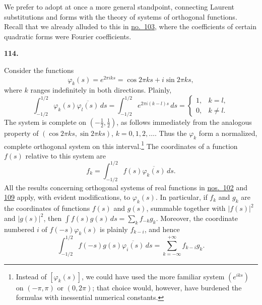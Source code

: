 \documentclass[
  paper=b5,
  fontsize=13pt,
  twoside=true,
  open=any,
  bookmarkpackage=false,
  chapterprefix=true,
  headings=normal
]{scrbook}
\theoremstyle{definition}
\newcommand{\numberedparagraph}[1]{%
  \par\medskip\phantomsection\label{sec:#1}%
  \noindent\textbf{#1.}\enspace
}
\begin{document}
We prefer to adopt at once a more general standpoint, connecting Laurent
substitutions and forms with the theory of systems of orthogonal functions.
Recall that we already alluded to this in \hyperref[sec:103]{no.~103}, where
the coefficients of certain quadratic forms were Fourier coefficients.

\numberedparagraph{114}
Consider the functions
\[
  \varphi_k(s)=e^{2\pi iks}=\cos2\pi ks+i\sin2\pi ks,
\]
where \(k\) ranges indefinitely in both directions.  Plainly,
\[
  \int_{-1/2}^{1/2}\varphi_k(s)\overline{\varphi_l(s)}\,ds
  =\int_{-1/2}^{1/2}e^{2\pi i(k-l)s}\,ds
  =\begin{cases}1,&k=l,\\0,&k\ne l.\end{cases}
\]
The system is complete on \((-\tfrac12,\tfrac12)\), as follows immediately
from the analogous property of
\((\cos2\pi ks,\sin2\pi ks)\), \(k=0,1,2,\ldots\).  Thus the
\(\varphi_k\) form a normalized, complete orthogonal system on this
interval.\footnote{Instead of \([\varphi_k(s)]\), we could have used the more
familiar system \((e^{iks})\) on \((-\pi,\pi)\) or \((0,2\pi)\); that choice
would, however, have burdened the formulas with inessential numerical
constants.}
The coordinates of a function \(f(s)\) relative to this system are
\[
  f_k=\int_{-1/2}^{1/2}f(s)\overline{\varphi_k(s)}\,ds.
\]
All the results concerning orthogonal systems of real functions in
\hyperref[sec:102]{nos.~102} and \hyperref[sec:109]{109} apply, with evident
modifications, to \(\varphi_k(s)\).  In particular, if \(f_k\) and \(g_k\)
are the coordinates of functions \(f(s)\) and \(g(s)\), summable together
with \(|f(s)|^2\) and \(|g(s)|^2\), then
\(\int f(s)g(s)\,ds=\sum_k f_{-k}g_k\).  Moreover, the coordinate numbered
\(i\) of \(f(-s)\varphi_k(s)\) is plainly \(f_{k-i}\), and hence
\begin{equation}
  \int_{-1/2}^{1/2}f(-s)g(s)\overline{\varphi_i(s)}\,ds
  =\sum_{k=-\infty}^{+\infty}f_{k-i}g_k.
  \tag{17}\label{eq:114:17}
\end{equation}
\end{document}
